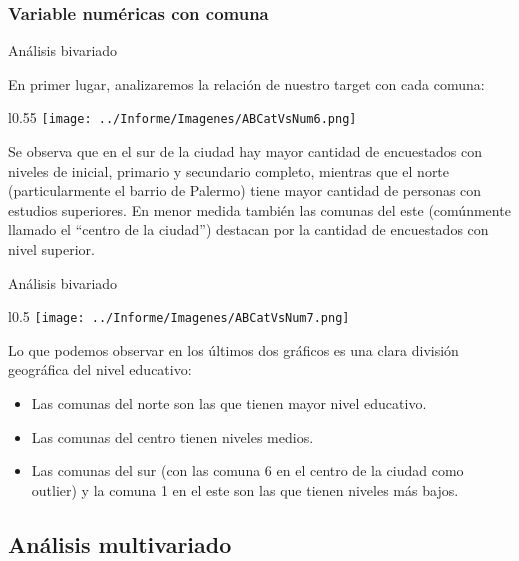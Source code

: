 \documentclass[pdf]{beamer}
\begin{document}
    \subsubsection{Variable numéricas con comuna}

\begin{frame}{Análisis bivariado}
    \footnotesize
    
    En primer lugar, analizaremos la relación de nuestro target con cada comuna: 
    \newline

    \begin{wrapfigure}{l}{0.55\textwidth}
        \centering
        \texttt{[image: ../Informe/Imagenes/ABCatVsNum6.png]}
    \end{wrapfigure}
    
    Se observa que en el sur de la ciudad hay  mayor cantidad de encuestados con niveles de inicial, primario y secundario completo, mientras que el norte (particularmente el barrio de Palermo) tiene mayor cantidad de personas con estudios superiores. En menor medida también las comunas del este (comúnmente llamado el ``centro de la ciudad'') destacan por la cantidad de encuestados con nivel superior.

\end{frame}    

\begin{frame}{Análisis bivariado}
    \footnotesize

    \begin{wrapfigure}{l}{0.5\textwidth}
        \texttt{[image: ../Informe/Imagenes/ABCatVsNum7.png]}
    \end{wrapfigure}

    Lo que podemos observar en los últimos dos gráficos es una clara división geográfica del nivel educativo:
    \begin{itemize}
        \item Las comunas del norte son las que tienen mayor nivel educativo.
        \item Las comunas del centro tienen niveles medios.
        \item Las comunas del sur (con las comuna 6 en el centro de la ciudad como outlier) y la comuna 1 en el este son las que tienen niveles más bajos.
    \end{itemize}

\end{frame}

    \subsection{Análisis multivariado}
\end{document}
